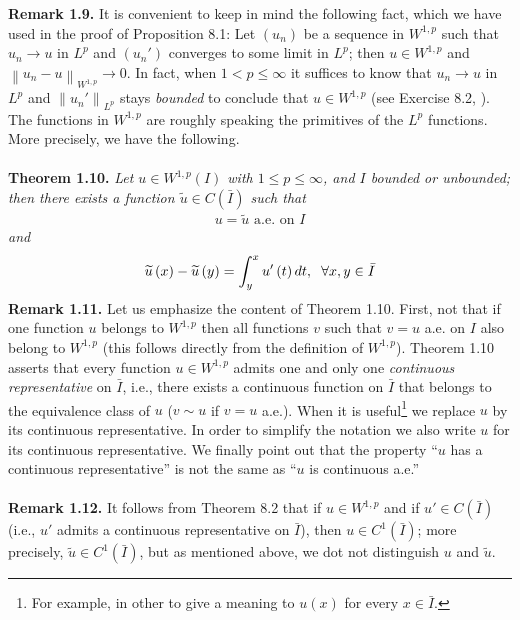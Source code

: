 \documentclass[a4paper,oneside]{book}
\numberwithin{equation}{chapter}
\begin{document}
\textbf{Remark 1.9.} It is convenient to keep in mind the following fact, which we have used in the proof of Proposition 8.1: Let $\left(u_n\right)$ be a sequence in $W^{1,p}$ such that $u_n\to u$ in $L^p$ and $\left(u_n'\right)$ converges to some limit in $L^p$; then $u \in W^{1,p}$ and ${\left\| {{u_n} - u} \right\|_{{W^{1,p}}}} \to 0$. In fact, when $1<p\le \infty$ it suffices to know that $u_n\to u$ in $L^p$ and ${\left\| {{u_n}'} \right\|_{{L^p}}}$ stays \textit{bounded} to conclude that $u\in W^{1,p}$ (see Exercise 8.2, \cite{1}).\\

The functions in $W^{1,p}$ are roughly speaking the primitives of the $L^p$ functions. More precisely, we have the following.\\
\\
\textbf{Theorem 1.10.} \textit{Let $u\in W^{1,p}\left(I\right)$ with $1\le p\le \infty$, and $I$ bounded or unbounded; then there exists a function $\widetilde{u} \in C\left(\bar{I}\right)$ such that}
\begin{align}
u=\widetilde{u} \mbox{ a.e. on }I
\end{align}
\textit{and}
\begin{align}
\widetilde u\left( x \right) - \widetilde u\left( y \right) = \int_y^x {u'\left( t \right)dt} ,\hspace{0.2cm}\forall x,y \in \bar I 
\end{align}
\textbf{Remark 1.11.} Let us emphasize the content of Theorem 1.10. First, not that if one function $u$ belongs to $W^{1,p}$ then all functions $v$ such that $v=u$ a.e. on $I$ also belong to $W^{1,p}$ (this follows directly from the definition of $W^{1,p}$). Theorem 1.10 asserts that every function $u \in W^{1,p}$ admits one and only one \textit{continuous representative} on $\bar{I}$, i.e., there exists a continuous function on $\bar{I}$ that belongs to the equivalence class of $u$ ($v \sim u$ if $v=u$ a.e.). When it is useful\footnote{For example, in other to give a meaning to $u\left(x\right)$ for every $x\in \bar{I}$.} we replace $u$ by its continuous representative. In order to simplify the notation we also write $u$ for its continuous representative. We finally point out that the property ``$u$ has a continuous representative'' is not the same as ``$u$ is continuous a.e.''\\
\\
\textbf{Remark 1.12.} It follows from Theorem 8.2 that if $u\in W^{1,p}$ and if $u'\in C\left(\bar{I}\right)$ (i.e., $u'$ admits a continuous representative on $\bar{I}$), then $u\in C^1\left(\bar{I}\right)$; more precisely, $\widetilde{u} \in C^1\left(\bar{I}\right)$, but as mentioned above, we dot not distinguish $u$ and $\widetilde{u}$.\\
\end{document}
